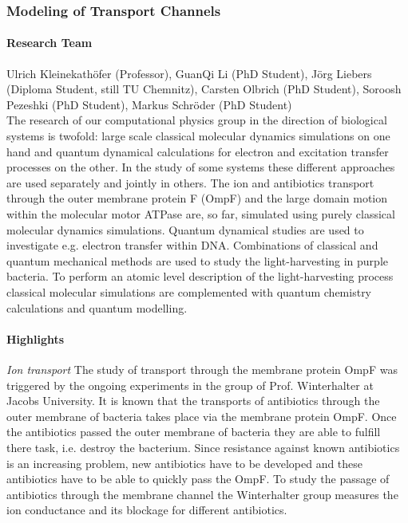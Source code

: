 \newpage
\subsubsection{Modeling of Transport Channels}
 \label{Bio:Kleinekathoefer}

\paragraph{Research Team}
Ulrich Kleinekath\"ofer (Professor), GuanQi Li (PhD Student), J\"org Liebers
(Diploma Student, still TU Chemnitz), Carsten Olbrich
(PhD Student), Soroosh
Pezeshki (PhD Student), Markus Schr\"oder (PhD Student)\\


The research of our computational physics group in the direction of
biological systems is twofold: large scale classical molecular dynamics
simulations on one hand and quantum dynamical calculations for electron and
excitation transfer processes on the other. In the study of some systems
these different approaches are used separately and jointly in others.  The
ion and antibiotics transport through the outer membrane protein F (OmpF)
and the large domain motion within the molecular motor ATPase are, so far,
simulated using purely classical molecular dynamics simulations.  Quantum
dynamical studies are used to investigate e.g. electron transfer within
DNA.  Combinations of classical and quantum mechanical methods are used to
study the light-harvesting in purple bacteria. To perform an atomic level
description of the light-harvesting process classical molecular simulations
are complemented with quantum chemistry calculations and quantum modelling.



\paragraph{Highlights}
%
\emph{Ion transport} The study of transport through the membrane protein
OmpF was triggered by the ongoing experiments in the group of Prof.
Winterhalter at Jacobs University. It is known that the transports of antibiotics through
the outer membrane of bacteria takes place via the membrane protein OmpF.
Once the antibiotics passed the outer membrane of bacteria they are able to
fulfill there task, i.e. destroy the bacterium. Since resistance against
known antibiotics is an increasing problem, new antibiotics have to be
developed and these antibiotics have to be able to quickly pass the OmpF.
To study the passage of antibiotics through the membrane channel the
Winterhalter group measures the ion conductance and its blockage for
different antibiotics.


